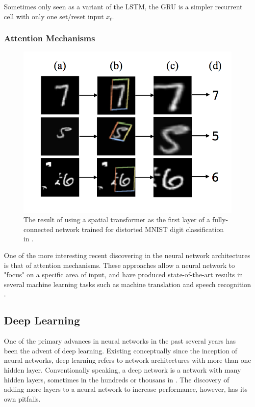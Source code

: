 Sometimes only seen as a variant of the LSTM, the GRU is a simpler recurrent cell with only one set/reset input $x_t$.


\subsubsection{Attention Mechanisms}

\begin{figure}[h]
    \centering
	\includegraphics[width=.5\textwidth]{./images/illustrations/attention}
    \caption{The result of using a spatial transformer as the
first layer of a fully-connected network trained for distorted
MNIST digit classification in \cite{DBLP:journals/corr/JaderbergSZK15}.}
    \label{fig:attention}
\end{figure}



One of the more interesting recent discovering in the neural network architectures is that of attention mechanisms.  These approaches allow a neural network to "focus" on a specific area of input, and have produced state-of-the-art results in several machine learning tasks such as machine translation and speech recognition \cite{DBLP:journals/corr/JaderbergSZK15}.

\subsection{Deep Learning}

One of the primary advances in neural networks in the past several years has been the advent of deep learning.  Existing conceptually since the inception of neural networks, deep learning refers to network architectures with more than one hidden layer.  Conventionally speaking, a deep network is a network with many hidden layers, sometimes in the hundreds or thousans in \cite{DBLP:journals/corr/HeZRS15}. The discovery of adding more layers to a neural network to increase performance, however, has its own pitfalls.

